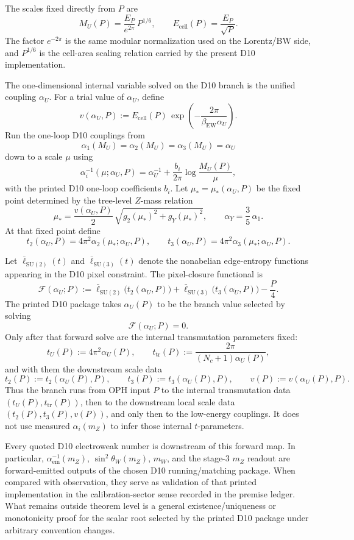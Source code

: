 \documentclass[11pt]{article}
\newcommand{\SU}{\mathrm{SU}}
\begin{document}
The scales fixed directly from \(P\) are
\[
M_U(P)=\frac{E_P}{e^{2\pi}}\,P^{1/6},
\qquad
E_{\mathrm{cell}}(P)=\frac{E_P}{\sqrt P}.
\]
The factor \(e^{-2\pi}\) is the same modular normalization used on the Lorentz/BW side, and \(P^{1/6}\) is the cell-area scaling relation carried by the present D10 implementation.

The one-dimensional internal variable solved on the D10 branch is the unified coupling \(\alpha_U\). For a trial value of \(\alpha_U\), define
\[
v(\alpha_U,P)
:=
E_{\mathrm{cell}}(P)\,
\exp\!\left(-\frac{2\pi}{\beta_{\mathrm{EW}}\alpha_U}\right).
\]
Run the one-loop D10 couplings from
\[
\alpha_1(M_U)=\alpha_2(M_U)=\alpha_3(M_U)=\alpha_U
\]
down to a scale \(\mu\) using
\[
\alpha_i^{-1}(\mu;\alpha_U,P)
=
\alpha_U^{-1}
+
\frac{b_i}{2\pi}\log\frac{M_U(P)}{\mu},
\]
with the printed D10 one-loop coefficients \(b_i\). Let \(\mu_\ast=\mu_\ast(\alpha_U,P)\) be the fixed point determined by the tree-level \(Z\)-mass relation
\[
\mu_\ast
=
\frac{v(\alpha_U,P)}{2}\,
\sqrt{g_2(\mu_\ast)^2+g_Y(\mu_\ast)^2},
\qquad
\alpha_Y=\frac35\,\alpha_1.
\]
At that fixed point define
\[
t_2(\alpha_U,P)=4\pi^2\alpha_2(\mu_\ast;\alpha_U,P),
\qquad
t_3(\alpha_U,P)=4\pi^2\alpha_3(\mu_\ast;\alpha_U,P).
\]

Let \(\bar\ell_{\SU(2)}(t)\) and \(\bar\ell_{\SU(3)}(t)\) denote the nonabelian edge-entropy functions appearing in the D10 pixel constraint. The pixel-closure functional is
\[
\mathcal F(\alpha_U;P)
:=
\bar\ell_{\SU(2)}\!\bigl(t_2(\alpha_U,P)\bigr)
+
\bar\ell_{\SU(3)}\!\bigl(t_3(\alpha_U,P)\bigr)
-\frac{P}{4}.
\]
The printed D10 package takes \(\alpha_U(P)\) to be the branch value selected by solving
\[
\mathcal F(\alpha_U;P)=0.
\]
Only after that forward solve are the internal transmutation parameters fixed:
\[
t_U(P):=4\pi^2\alpha_U(P),
\qquad
t_{\mathrm{tr}}(P):=\frac{2\pi}{(N_c+1)\alpha_U(P)},
\]
and with them the downstream scale data
\[
t_2(P):=t_2(\alpha_U(P),P),
\qquad
t_3(P):=t_3(\alpha_U(P),P),
\qquad
v(P):=v(\alpha_U(P),P).
\]
Thus the branch runs from OPH input \(P\) to the internal transmutation data
\((t_U(P),t_{\mathrm{tr}}(P))\), then to the downstream local scale data
\((t_2(P),t_3(P),v(P))\), and only then to the low-energy couplings. It does not use measured
\(\alpha_i(m_Z)\) to infer those internal \(t\)-parameters.

Every quoted D10 electroweak number is downstream of this forward map. In particular, \(\alpha_{\mathrm{em}}^{-1}(m_Z)\), \(\sin^2\theta_W(m_Z)\), \(m_W\), and the stage-3 \(m_Z\) readout are forward-emitted outputs of the chosen D10 running/matching package. When compared with observation, they serve as validation of that printed implementation in the calibration-sector sense recorded in the premise ledger. What remains outside theorem level is a general existence/uniqueness or monotonicity proof for the scalar root selected by the printed D10 package under arbitrary convention changes.
\end{document}
